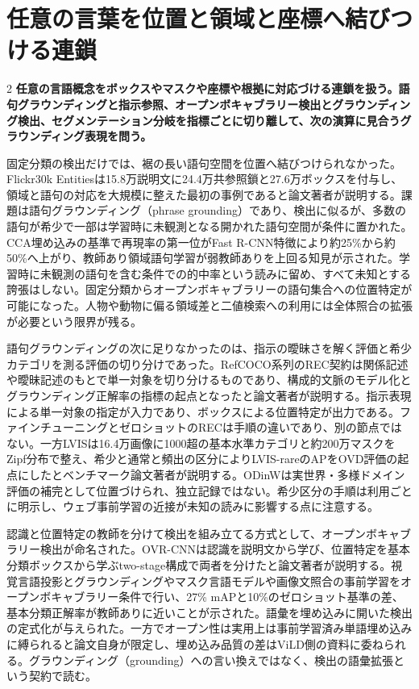 \documentclass[lualatex,a4paper,10pt]{jlreq}
\begin{document}
\section{任意の言葉を位置と領域と座標へ結びつける連鎖}
\label{sec:p07b}
\begin{multicols}{2}
\raggedcolumns
\noindent\textbf{任意の言語概念をボックスやマスクや座標や根拠に対応づける連鎖を扱う。語句グラウンディングと指示参照、オープンボキャブラリー検出とグラウンディング検出、セグメンテーション分岐を指標ごとに切り離して、次の演算に見合うグラウンディング表現を問う。}\autocite{vmd041,vmd047,vmd050}\par\medskip
\noindent 固定分類の検出だけでは、裾の長い語句空間を位置へ結びつけられなかった。Flickr30k Entitiesは15.8万説明文に24.4万共参照鎖と27.6万ボックスを付与し、領域と語句の対応を大規模に整えた最初の事例であると論文著者が説明する。課題は語句グラウンディング（phrase grounding）であり、検出に似るが、多数の語句が希少で一部は学習時に未観測となる開かれた語句空間が条件に置かれた。CCA埋め込みの基準で再現率の第一位がFast R-CNN特徴により約25\%から約50\%へ上がり、教師あり領域語句学習が弱教師ありを上回る知見が示された。学習時に未観測の語句を含む条件での的中率という読みに留め、すべて未知とする誇張はしない。固定分類からオープンボキャブラリーの語句集合への位置特定が可能になった。人物や動物に偏る領域差と二値検索への利用には全体照合の拡張が必要という限界が残る。\autocite{vmd041}\par\medskip
\noindent 語句グラウンディングの次に足りなかったのは、指示の曖昧さを解く評価と希少カテゴリを測る評価の切り分けであった。RefCOCO系列のREC契約は関係記述や曖昧記述のもとで単一対象を切り分けるものであり、構成的文脈のモデル化とグラウンディング正解率の指標の起点となったと論文著者が説明する。指示表現による単一対象の指定が入力であり、ボックスによる位置特定が出力である。ファインチューニングとゼロショットのRECは手順の違いであり、別の節点ではない。一方LVISは16.4万画像に1000超の基本水準カテゴリと約200万マスクをZipf分布で整え、希少と通常と頻出の区分によりLVIS-rareのAPをOVD評価の起点にしたとベンチマーク論文著者が説明する。ODinWは実世界・多様ドメイン評価の補完として位置づけられ、独立記録ではない。希少区分の手順は利用ごとに明示し、ウェブ事前学習の近接が未知の読みに影響する点に注意する。\autocite{vmd042,vmd056}\par\medskip
\noindent 認識と位置特定の教師を分けて検出を組み立てる方式として、オープンボキャブラリー検出が命名された。OVR-CNNは認識を説明文から学び、位置特定を基本分類ボックスから学ぶtwo-stage構成で両者を分けたと論文著者が説明する。視覚言語投影とグラウンディングやマスク言語モデルや画像文照合の事前学習をオープンボキャブラリー条件で行い、27\% mAPと10\%のゼロショット基準の差、基本分類正解率が教師ありに近いことが示された。語彙を埋め込みに開いた検出の定式化が与えられた。一方でオープン性は実用上は事前学習済み単語埋め込みに縛られると論文自身が限定し、埋め込み品質の差はViLD側の資料に委ねられる。グラウンディング（grounding）への言い換えではなく、検出の語彙拡張という契約で読む。\autocite{vmd043}\par\medskip

\end{multicols}
\end{document}
